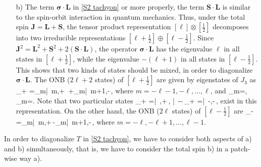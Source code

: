 \documentclass[12pt]{article}
\numberwithin{equation}{section}
\newcommand{\Ket}[1]{\left|\, #1\,\right\rangle}
\def\bea#1\ena{\begin{align}#1\end{align}}
\begin{document}
\begin{enumerate}
\item[b)]
The term $\boldsymbol{\sigma} \cdot \boldsymbol{L}$ in \eqref{S2 tachyon}
or more properly, the term $\boldsymbol{S} \cdot \boldsymbol{L}$ 
is similar to the spin-orbit interaction in quantum mechanics.
Thus, under the total spin $\boldsymbol{J}=\boldsymbol{L}+\boldsymbol{S}$, 
the tensor product representation
$[\ell]\otimes [\frac{1}{2}]$ decomposes into two irreducible 
representations $[\ell + \frac{1}{2}]\oplus [\ell - \frac{1}{2}]$.
Since $\boldsymbol{J}^2=\boldsymbol{L}^2+\boldsymbol{S}^2+2(\boldsymbol{S}\cdot \boldsymbol{L})$, 
the operator $\boldsymbol{\sigma}\cdot \boldsymbol{L}$ has the eigenvalue $\ell$ in all states in $[\ell + \frac{1}{2}]$,
while the eigenvalue $-(\ell+1)$ in all states in $[\ell - \frac{1}{2}]$.
This shows that two kinds of states should be mixed, in order to diagonalize 
$\boldsymbol{\sigma} \cdot \boldsymbol{L}$.
The ONB ($2\ell+2$ states) of $[\ell + \frac{1}{2}]$ are given by 
eigenstates of $J_3$ as
\bea
\Ket{m+\textstyle{\frac{1}{2}}}_{\ell + }
=\alpha_m\Ket{m,+}
+\beta_m\Ket{m+1,-},
\ena
where $m=-\ell-1,-\ell,\ldots,\ell$, and 
\bea
\alpha_m=,\qquad
\beta_m=.
\label{alphabeta}
\ena
Note that two particular states 
\bea
\Ket{\ell+\textstyle{\frac{1}{2}}}_{\ell + }=\Ket{\ell,+},
\quad \Ket{-\ell-}_{\ell + }=\Ket{-\ell,-},
\ena
exist in this representation.
On the other hand, the ONB ($2\ell$ states) of $[\ell - \frac{1}{2}]$ are
\bea
\Ket{m+\textstyle{\frac{1}{2}}}_{\ell - }
=\beta_m\Ket{m,+}-\alpha_m\Ket{m+1,-},
\ena
where $m=-\ell,-\ell+1,\ldots,\ell-1$.
\end{enumerate}
In order to diagonalize $T$ in \eqref{S2 tachyon}, 
{we have} to consider both 
{aspects of} a) and b) simultaneously,
that is, 
{we have to consider the total spin b) in a patch-wise way a).}

\end{document}
